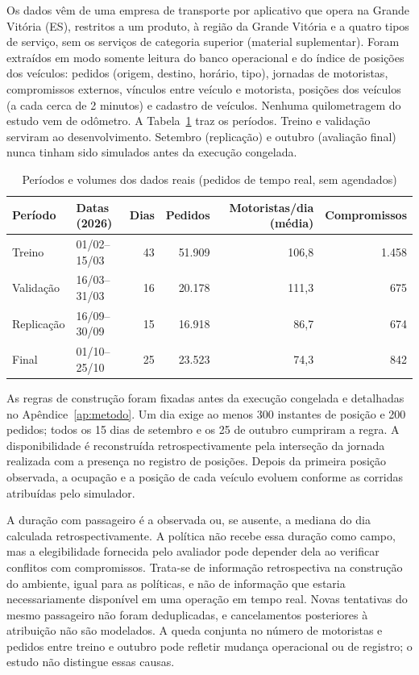 Os dados vêm de uma empresa de transporte por aplicativo que opera na Grande Vitória (ES), restritos a um produto, à região da Grande Vitória e a quatro tipos de serviço, sem os serviços de categoria superior (material suplementar). Foram extraídos em modo somente leitura do banco operacional e do índice de posições dos veículos: pedidos (origem, destino, horário, tipo), jornadas de motoristas, compromissos externos, vínculos entre veículo e motorista, posições dos veículos (a cada cerca de 2 minutos) e cadastro de veículos. Nenhuma quilometragem do estudo vem de odômetro. A Tabela~\ref{tab:periodos} traz os períodos. Treino e validação serviram ao desenvolvimento. Setembro (replicação) e outubro (avaliação final) nunca tinham sido simulados antes da execução congelada.

\begin{table}[!htb]
\caption{Períodos e volumes dos dados reais (pedidos de tempo real, sem agendados)}\label{tab:periodos}
\centering\fontetabela
\begin{tabular}{|l|l|r|r|r|r|}
\hline
\textbf{Período} & \textbf{Datas (2026)} & \textbf{Dias} & \textbf{Pedidos} & \textbf{Motoristas/dia (média)} & \textbf{Compromissos} \\
\hline
Treino & 01/02--15/03 & 43 & 51.909 & 106,8 & 1.458 \\
\hline
Validação & 16/03--31/03 & 16 & 20.178 & 111,3 & 675 \\
\hline
Replicação & 16/09--30/09 & 15 & 16.918 & 86,7 & 674 \\
\hline
Final & 01/10--25/10 & 25 & 23.523 & 74,3 & 842 \\
\hline
\end{tabular}
\end{table}

As regras de construção foram fixadas antes da execução congelada e detalhadas no Apêndice~\ref{ap:metodo}. Um dia exige ao menos 300 instantes de posição e 200 pedidos; todos os 15 dias de setembro e os 25 de outubro cumpriram a regra. A disponibilidade é reconstruída retrospectivamente pela interseção da jornada realizada com a presença no registro de posições. Depois da primeira posição observada, a ocupação e a posição de cada veículo evoluem conforme as corridas atribuídas pelo simulador.

A duração com passageiro é a observada ou, se ausente, a mediana do dia calculada retrospectivamente. A política não recebe essa duração como campo, mas a elegibilidade fornecida pelo avaliador pode depender dela ao verificar conflitos com compromissos. Trata-se de informação retrospectiva na construção do ambiente, igual para as políticas, e não de informação que estaria necessariamente disponível em uma operação em tempo real. Novas tentativas do mesmo passageiro não foram deduplicadas, e cancelamentos posteriores à atribuição não são modelados. A queda conjunta no número de motoristas e pedidos entre treino e outubro pode refletir mudança operacional ou de registro; o estudo não distingue essas causas.

